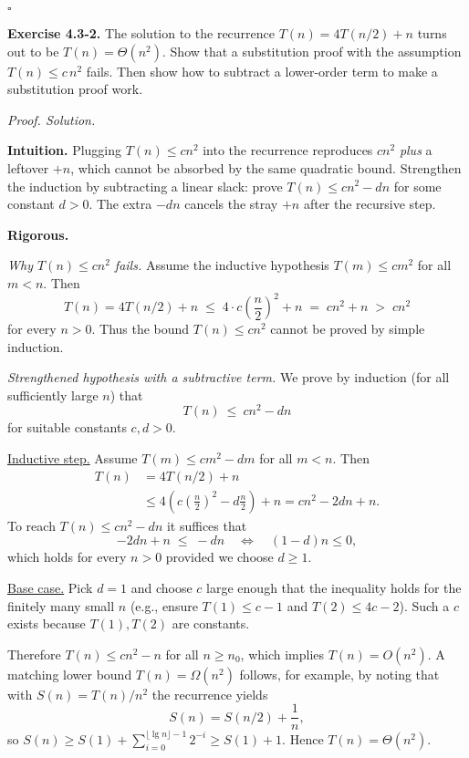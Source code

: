 \documentclass[12pt]{article}
\theoremstyle{definition}
\begin{document}
\hfill$\square$

\newpage

\noindent\textbf{Exercise 4.3-2.}
The solution to the recurrence $T(n)=4T(n/2)+n$ turns out to be $T(n)=\Theta(n^2)$.
Show that a substitution proof with the assumption $T(n)\le c\,n^2$ fails.
Then show how to subtract a lower-order term to make a substitution proof work.

\medskip
\noindent\textit{Proof. Solution.}

\noindent\textbf{Intuition.}
Plugging $T(n)\le c n^2$ into the recurrence reproduces $c n^2$ \emph{plus} a leftover $+n$,
which cannot be absorbed by the same quadratic bound. Strengthen the induction by
subtracting a linear slack: prove $T(n)\le c n^2 - d n$ for some constant $d>0$.
The extra $-dn$ cancels the stray $+n$ after the recursive step.

\noindent\textbf{Rigorous.}

\emph{Why $T(n)\le c n^2$ fails.}
Assume the inductive hypothesis $T(m)\le c m^2$ for all $m<n$. Then
\[
T(n)=4T(n/2)+n \;\le\; 4\cdot c\left(\frac{n}{2}\right)^2 + n
\;=\; c n^2 + n \;>\; c n^2
\]
for every $n>0$. Thus the bound $T(n)\le c n^2$ cannot be proved by simple induction.

\smallskip
\emph{Strengthened hypothesis with a subtractive term.}
We prove by induction (for all sufficiently large $n$) that
\[
T(n)\ \le\ c n^2 - d n
\]
for suitable constants $c,d>0$.

\underline{Inductive step.}
Assume $T(m)\le c m^2 - d m$ for all $m<n$. Then
\[
\begin{aligned}
T(n)
&= 4T(n/2)+n \\
&\le 4\!\left(c\left(\frac{n}{2}\right)^2 - d\frac{n}{2}\right) + n
= c n^2 - 2 d n + n.
\end{aligned}
\]
To reach $T(n)\le c n^2 - d n$ it suffices that
\[
-2 d n + n \;\le\; - d n \quad\Longleftrightarrow\quad (1-d)n \le 0,
\]
which holds for every $n>0$ provided we choose $d\ge 1$.

\underline{Base case.}
Pick $d=1$ and choose $c$ large enough that the inequality holds for the finitely many
small $n$ (e.g., ensure $T(1)\le c-1$ and $T(2)\le 4c-2$). Such a $c$ exists because $T(1),T(2)$ are constants.

Therefore $T(n)\le c n^2 - n$ for all $n\ge n_0$, which implies $T(n)=O(n^2)$.
A matching lower bound $T(n)=\Omega(n^2)$ follows, for example, by noting that
with $S(n)=T(n)/n^2$ the recurrence yields
\[
S(n) = S(n/2) + \frac{1}{n},
\]
so $S(n)\ge S(1) + \sum_{i=0}^{\lfloor \lg n\rfloor-1} 2^{-i} \ge S(1)+1$.
Hence $T(n)=\Theta(n^2)$.
\end{document}
